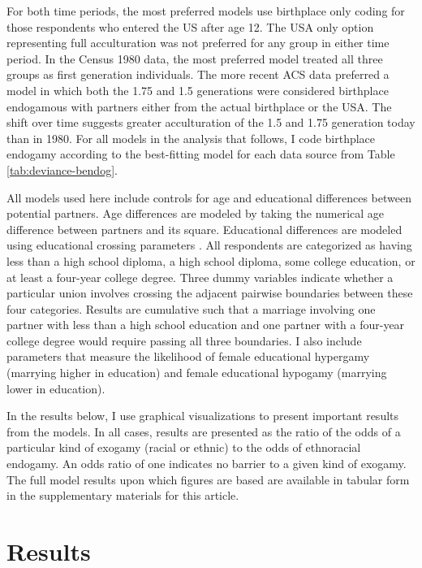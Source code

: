 \documentclass[11pt,]{article}
\begin{document}
For both time periods, the most preferred models use birthplace only coding for those respondents who entered the US after age 12. The USA only option representing full acculturation was not preferred for any group in either time period. In the Census 1980 data, the most preferred model treated all three groups as first generation individuals. The more recent ACS data preferred a model in which both the 1.75 and 1.5 generations were considered birthplace endogamous with partners either from the actual birthplace or the USA. The shift over time suggests greater acculturation of the 1.5 and 1.75 generation today than in 1980. For all models in the analysis that follows, I code birthplace endogamy according to the best-fitting model for each data source from Table \ref{tab:deviance-bendog}.

All models used here include controls for age and educational differences between potential partners. Age differences are modeled by taking the numerical age difference between partners and its square. Educational differences are modeled using educational crossing parameters \citep{schwartz_trends_2005}. All respondents are categorized as having less than a high school diploma, a high school diploma, some college education, or at least a four-year college degree. Three dummy variables indicate whether a particular union involves crossing the adjacent pairwise boundaries between these four categories. Results are cumulative such that a marriage involving one partner with less than a high school education and one partner with a four-year college degree would require passing all three boundaries. I also include parameters that measure the likelihood of female educational hypergamy (marrying higher in education) and female educational hypogamy (marrying lower in education).

In the results below, I use graphical visualizations to present important results from the models. In all cases, results are presented as the ratio of the odds of a particular kind of exogamy (racial or ethnic) to the odds of ethnoracial endogamy. An odds ratio of one indicates no barrier to a given kind of exogamy. The full model results upon which figures are based are available in tabular form in the supplementary materials for this article.

\hypertarget{results}{%
\section{Results}\label{results}}
\end{document}
